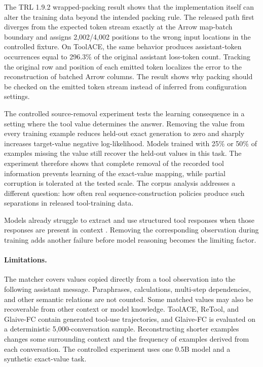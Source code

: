 \documentclass[pdflatex,sn-basic,Numbered]{sn-jnl}
\begin{document}
The TRL 1.9.2 wrapped-packing result shows that the implementation itself can alter the training
data beyond the intended packing rule. The released path first diverges from the expected token
stream exactly at the Arrow map-batch boundary and assigns 2,002/4,002 positions to the wrong
input locations in the controlled fixture. On ToolACE, the same behavior produces assistant-token
occurrences equal to 296.3\% of the original assistant loss-token count. Tracking the original row and position of each emitted token localizes the error to the
reconstruction of batched Arrow columns. The result shows why packing should be checked on the
emitted token stream instead of inferred from configuration settings.

The controlled source-removal experiment tests the learning consequence in a setting where the
tool value determines the answer. Removing the value from every training example reduces held-out
exact generation to zero and sharply increases target-value negative log-likelihood. Models trained
with 25\% or 50\% of examples missing the value still recover the held-out values in this task.
The experiment therefore shows that complete removal of the recorded tool information prevents
learning of the exact-value mapping, while partial corruption is tolerated at the tested scale.
The corpus analysis addresses a different question: how often real sequence-construction policies
produce such separations in released tool-training data.

Models already struggle to extract and use structured tool responses when those responses are
present in context \citep{kate2026tooloutputs}. Removing the corresponding observation during
training adds another failure before model reasoning becomes the limiting factor.

\paragraph{Limitations.}
The matcher covers values copied directly from a tool observation into the following assistant
message. Paraphrases, calculations, multi-step dependencies, and other semantic relations are not
counted. Some matched values may also be recoverable from other context or model knowledge. ToolACE, ReTool, and Glaive-FC contain generated tool-use trajectories, and Glaive-FC is
evaluated on a deterministic 5,000-conversation sample. Reconstructing shorter examples changes
some surrounding context and the frequency of examples derived from each conversation. The
controlled experiment uses one 0.5B model and a synthetic exact-value task.
\end{document}
